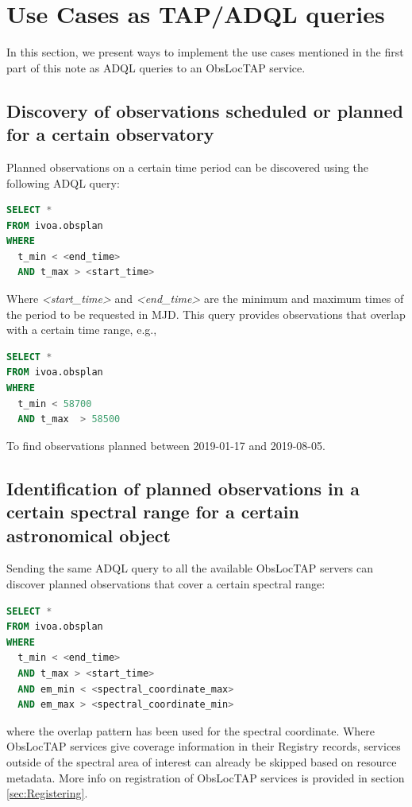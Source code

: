 \documentclass[11pt,a4paper]{ivoa}
\begin{document}
\vspace{\baselineskip}
\section{Use Cases as TAP/ADQL queries}
In this section, we present ways to implement the use cases mentioned in the
first part of this note as ADQL queries to an ObsLocTAP service.

\subsection{Discovery of observations scheduled or planned for a certain
observatory}
Planned observations on a certain time period can be discovered using the
following ADQL query:

\begin{lstlisting}[language=SQL]
SELECT * 
FROM ivoa.obsplan 
WHERE
  t_min < <end_time>
  AND t_max > <start_time>
\end{lstlisting}
Where \textit{<start\_time>} and \textit{<end\_time> }are the minimum and
maximum times of the period to be requested in MJD. This query provides
observations that overlap with a certain time range, e.g.,

\begin{lstlisting}[language=SQL]
SELECT *
FROM ivoa.obsplan
WHERE
  t_min < 58700
  AND t_max  > 58500
\end{lstlisting}

To find observations planned between 2019-01-17 and 2019-08-05.

\subsection{Identification of planned observations in a certain spectral range
for a certain astronomical object}
Sending the same ADQL query to all the available ObsLocTAP servers can discover
planned observations that cover a certain spectral range:

\begin{lstlisting}[language=SQL]
SELECT *
FROM ivoa.obsplan
WHERE
  t_min < <end_time>
  AND t_max > <start_time>
  AND em_min < <spectral_coordinate_max>
  AND em_max > <spectral_coordinate_min>
\end{lstlisting}
where the overlap pattern has been used for the spectral coordinate.
Where ObsLocTAP services give coverage information in their Registry records,
services outside of the spectral area of interest can already be skipped based
on resource metadata. More info on registration of ObsLocTAP services is provided
in section \ref{sec:Registering}.
\par
\end{document}
